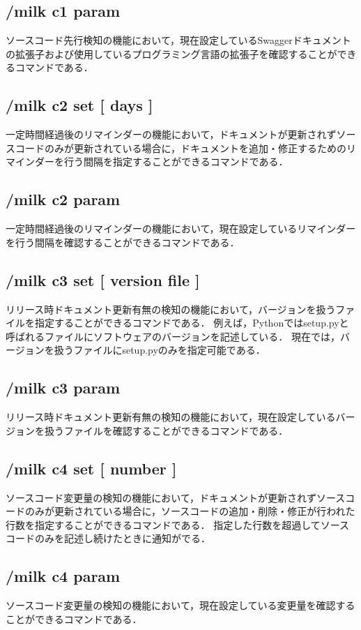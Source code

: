 \subsection*{/milk c1 param}
ソースコード先行検知の機能において，現在設定しているSwaggerドキュメントの拡張子および使用しているプログラミング言語の拡張子を確認することができるコマンドである．

\subsection*{/milk c2 set [ days ]}
一定時間経過後のリマインダーの機能において，ドキュメントが更新されずソースコードのみが更新されている場合に，ドキュメントを追加・修正するためのリマインダーを行う間隔を指定することができるコマンドである．

\subsection*{/milk c2 param}
一定時間経過後のリマインダーの機能において，現在設定しているリマインダーを行う間隔を確認することができるコマンドである．

\subsection*{/milk c3 set [ version file ]}
リリース時ドキュメント更新有無の検知の機能において，バージョンを扱うファイルを指定することができるコマンドである．
例えば，Pythonではsetup.pyと呼ばれるファイルにソフトウェアのバージョンを記述している．
現在では，バージョンを扱うファイルにsetup.pyのみを指定可能である．

\subsection*{/milk c3 param}
リリース時ドキュメント更新有無の検知の機能において，現在設定しているバージョンを扱うファイルを確認することができるコマンドである．

\subsection*{/milk c4 set [ number ]}
ソースコード変更量の検知の機能において，ドキュメントが更新されずソースコードのみが更新されている場合に，ソースコードの追加・削除・修正が行われた行数を指定することができるコマンドである．
指定した行数を超過してソースコードのみを記述し続けたときに通知がでる．

\subsection*{/milk c4 param}
ソースコード変更量の検知の機能において，現在設定している変更量を確認することができるコマンドである．

